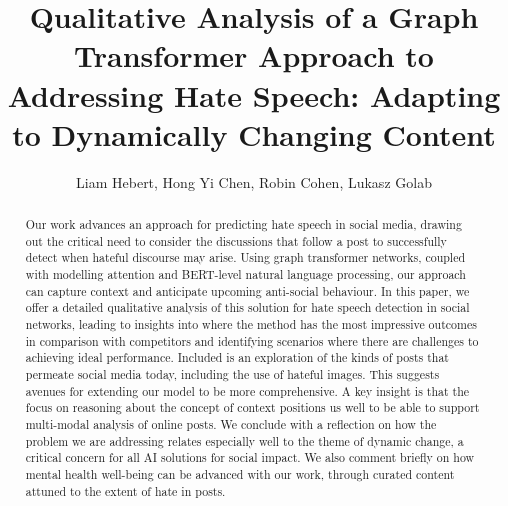 \documentclass[letterpaper]{article} %
\title{Qualitative Analysis of a Graph Transformer Approach to Addressing Hate Speech:
Adapting to Dynamically Changing Content}
\author{
    Liam Hebert,
    Hong Yi Chen,
    Robin Cohen,
    Lukasz Golab
}
\begin{document}
\maketitle

\begin{abstract}
Our work advances an approach for predicting hate speech in social media, drawing out the critical need to consider the discussions that follow a post to successfully detect when hateful discourse may arise. Using graph transformer networks, coupled with modelling attention and BERT-level natural language processing, our approach can capture context and anticipate upcoming anti-social behaviour. In this paper, we offer a detailed qualitative analysis of this solution for hate speech detection in social networks, leading to insights into where the method has the most impressive outcomes in comparison with competitors and identifying scenarios where there are challenges to achieving ideal performance. Included is an exploration of the kinds of posts that permeate social media today, including the use of hateful images. This suggests avenues for extending our model to be more comprehensive. A key insight is that the focus on reasoning about the concept of context positions us well to be able to support multi-modal analysis of online posts. We conclude with a reflection on how the problem we are addressing relates especially well to the theme of dynamic change, a critical concern for all AI solutions for social impact. We also comment briefly on how mental health well-being can be advanced with our work, through curated content attuned to the extent of hate in posts.
\end{abstract}
\end{document}
